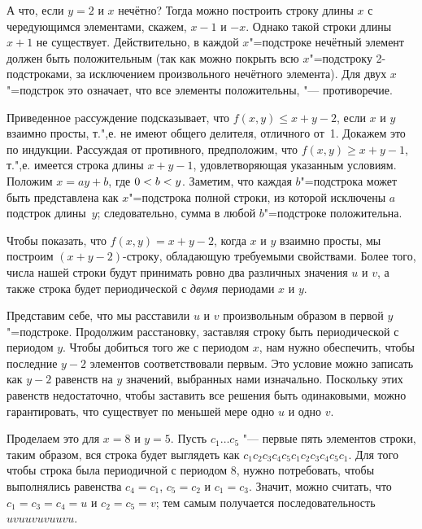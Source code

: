 \documentclass[twoside]{book}
\begin{document}
А что, если $y=2$ и $x$ нечётно?
Тогда можно построить строку длины $x$ с чередующимся элементами, скажем, $x-1$ и $-x$.
Однако такой строки длины $x+1$ не существует.
Действительно, в каждой $x$"=подстроке нечётный элемент должен быть положительным 
(так как можно покрыть всю $x$"=подстроку 2-подстроками, за исключением произвольного нечётного элемента).
Для двух $x$"=подстрок это означает, что все элементы положительны, "---
противоречие.

Приведенное pассуждение подсказывает, что $f(x,y)\le x+y-2$, если $x$ и $y$ взаимно просты, 
т.",е. не имеют общего делителя, отличного от~1.
Докажем это по индукции.
Рассуждая от противного, предположим, что $f(x,y)\ge x+y-1$,
т.",е. имеется строка длины $x+y-1$, удовлетворяющая указанным условиям.
Положим $x=ay+b$, где $0\z<b\z<y$.
Заметим, что каждая $b$"=подстрока  
может быть представлена как $x$"=подстрока полной строки, 
из которой исключены $a$ подстрок длины~$y$; 
следовательно, сумма в любой  $b$"=подстроке положительна.

Чтобы показать, что $f(x,y)=x+y-2$, когда $x$ и $y$ взаимно просты, мы построим $(x+y-2)$-строку, обладающую требуемыми свойствами.
Более того, числа нашей строки будут принимать ровно два различных значения $u$ и $v$,
а также строка будет периодической с \emph{двумя} периодами $x$ и $y$.

Представим себе, что мы расставили $u$ и $v$ произвольным образом в первой $y$"=подстроке.
Продолжим расстановку, заставляя строку быть периодической с периодом $y$.
Чтобы добиться того же с периодом $x$,
нам нужно обеспечить, чтобы последние $y-2$ элементов соответствовали первым.
Это условие можно записать как $y-2$ равенств на $y$ значений, выбранных нами изначально.
Поскольку этих равенств недостаточно, чтобы заставить все решения быть одинаковыми, можно гарантировать, что существует по меньшей мере одно $u$ и одно $v$.

Проделаем это для $x=8$ и $y=5$.
Пусть $c_1\dots c_5$ "--- первые пять элементов строки, 
таким образом, вся строка будет выглядеть как
$c_1c_2c_3c_4c_5c_1c_2c_3c_4c_5c_1$.
Для того чтобы строка была периодичной с периодом 8, 
нужно потребовать, чтобы выполнялись равенства $c_4=c_1$, $c_5=c_2$ и $c_1=c_3$.
Значит, можно считать, что $c_1=c_3=c_4=u$ и $c_2=c_5=v$; 
тем самым получается последовательность $uvuuvuvuuvu$.
\end{document}

